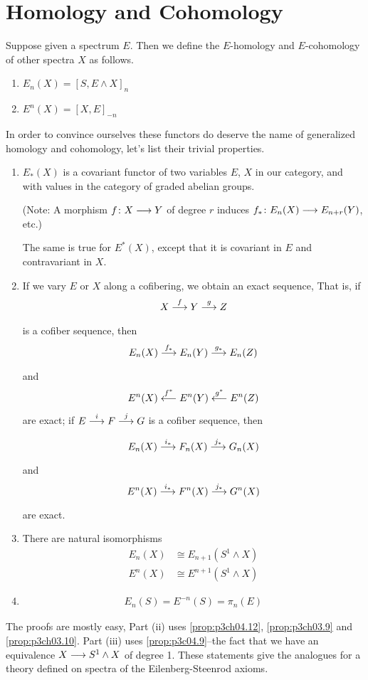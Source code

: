 \documentclass[../main]{subfiles}
\begin{document}
\chapter{Homology and Cohomology}
\label{sec:p3c06}


Suppose given a spectrum $E$. Then we define the $E$-homology and $E$-cohomology of other spectra $X$ as follows.
\begin{enumerate}
    \item $E_n(X) = [S, E \wedge X]_n$
    \item $E^n(X) = [X, E]_{-n}$
\end{enumerate}
In order to convince ourselves these functors do deserve the name of generalized homology and cohomology, let's list their trivial properties.
\begin{proposition}\label{prop:p3c06.1}
\begin{enumerate}
    \item $E_\ast(X)$ is a covariant functor of two variables $E$, $X$ in our category, and with values in the category of graded abelian groups.
    
    (Note: A morphism $f\colon X \longrightarrow Y$ of degree $r$ induces $f_\ast\colon E_n(X)\longrightarrow E_{n+r}(Y)$, etc.)
    
    The same is true for $E^\ast(X)$, except that it is covariant in $E$ and contravariant in $X$. 
    \item If we vary $E$ or $X$ along a cofibering, we obtain an exact sequence, That is, if
    \[X \lar{f} Y \lar{g} Z\]
    is a cofiber sequence, then
    \[E_n(X) \lar{f_\ast} E_n(Y) \lar{g_\ast}E_n(Z)\]
    and
    \[E^n(X) \overset{f^\ast}{\longleftarrow} E^n(Y) \overset{g^\ast}{\longleftarrow} E^n(Z)\]
    are exact; if $E \lar{i} F \lar{j} G$ is a cofiber sequence, then
    \[E_n(X) \lar{i_\ast} F_n(X) \lar{j_\ast} G_n(X)\]
    and
    \[E^n(X) \lar{i_\ast} F^n(X) \lar{j_\ast} G^n(X)\]
    are exact.
    \item There are natural isomorphisms
    \begin{align}
        E_n(X) &\cong E_{n+1}(S^1 \wedge X) \nonumber \\
        E^n(X) &\cong E^{n+1}(S^1 \wedge X)\nonumber
    \end{align}
    \item
    \begin{align}
        E_n(S)=E^{-n}(S)=\pi_n(E) \nonumber
    \end{align}
\end{enumerate}
\end{proposition}
The proofs are mostly easy, Part (ii) uses \ref{prop:p3ch04.12}, \ref{prop:p3ch03.9} and \ref{prop:p3ch03.10}. Part (iii) uses \ref{prop:p3c04.9}--the fact that we have an equivalence $X\longrightarrow S^1 \wedge X$ of degree 1. %
These statements give the analogues for a theory defined on spectra of the Eilenberg-Steenrod axioms.
\end{document}
